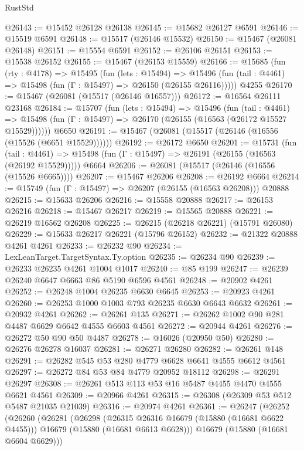 \begin{lexlean}{RustStd}
\begin{coremodule}
@26143 := @15452 @26128 @26138
@26145 := @15682 @26127 @6591
@26146 := @15519 @6591
@26148 := @15517 (@26146 @15532)
@26150 := @15467 (@26081 @26148)
@26151 := @15554 @6591
@26152 := @26106 @26151
@26153 := @15538 @26152
@26155 := @15467 (@26153 @15559)
@26166 := @15685
    (fun (rty : @4178) =>
    @15495
      (fun (lets : @15494) =>
      @15496 (fun (tail : @4461) => @15498 (fun (Γ : @15497) => @26150 (@26155 @26116)))))
    @4255
@26170 := @15467 (@26081 (@15517 (@26146 @16557)))
@26172 := @16564 @26111 @23168
@26184 := @15707
    (fun (lets : @15494) =>
    @15496
      (fun (tail : @4461) =>
      @15498 (fun (Γ : @15497) => @26170 (@26155 (@16563 (@26172 @15527 @15529))))))
    @6650
@26191 := @15467 (@26081 (@15517 (@26146 (@16556 (@15526 (@6651 @15529))))))
@26192 := @26172 @6650
@26201 := @15731
    (fun (tail : @4461) => @15498 (fun (Γ : @15497) => @26191 (@26155 (@16563 (@26192 @15529)))))
    @6664
@26206 := @26081 (@15517 (@26146 (@16556 (@15526 @6665))))
@26207 := @15467 @26206
@26208 := @26192 @6664
@26214 := @15749 (fun (Γ : @15497) => @26207 (@26155 (@16563 @26208))) @20888
@26215 := @15633 @26206
@26216 := @15558 @20888
@26217 := @26153 @26216
@26218 := @15467 @26217
@26219 := @15565 @20888
@26221 := @26219 @16562 @26208
@26225 := @26215 (@26218 @26221) (@15791 @26080)
@26229 := @15633 @26217 @26221 (@15796 @26152)
@26232 := @21322 @20888 @4261 @4261
@26233 := @26232 @90
@26234 := LexLeanTarget.TargetSyntax.Ty.option
@26235 := @26234 @90
@26239 := @26233 @26235 @4261 @1004 @1017
@26240 := @85 @199
@26247 := @26239 @26240 @6647 @6663 @86 @5190 @6596 @4561
@26248 := @20902 @4261
@26252 := @26248 @1004 @26235 @6630 @6645
@26253 := @20923 @4261
@26260 := @26253 @1000 @1003 @793 @26235 @6630 @6643 @6632
@26261 := @20932 @4261
@26262 := @26261 @135
@26271 := @26262 @1002 @90 @281 @4487 @6629 @6642 @4555 @6603 @4561
@26272 := @20944 @4261
@26276 := @26272 @50 @90 @50 @4487
@26278 := @16026 (@20950 @50)
@26280 := @26276 @26278 @16037
@26281 := @26271 @26280
@26282 := @26261 @148
@26291 := @26282 @545 @53 @280 @4779 @6628 @6641 @4555 @6612 @4561
@26297 := @26272 @84 @53 @84 @4779 @20952 @18112
@26298 := @26291 @26297
@26308 := @26261 @513 @113 @53 @16 @5487 @4455 @4470 @4555 @6621 @4561
@26309 := @20966 @4261
@26315 := @26308 (@26309 @53 @512 @5487 @21035 @21039)
@26316 := @20974 @4261
@26361 := @26247
    (@26252
      (@26260
        (@26281
          (@26298
            (@26315 @26316 @16679 (@15880 (@16681 @6622 @4455)))
            @16679
            (@15880 (@16681 @6613 @6628)))
          @16679
          (@15880 (@16681 @6604 @6629)))

\end{coremodule}
\end{lexlean}
